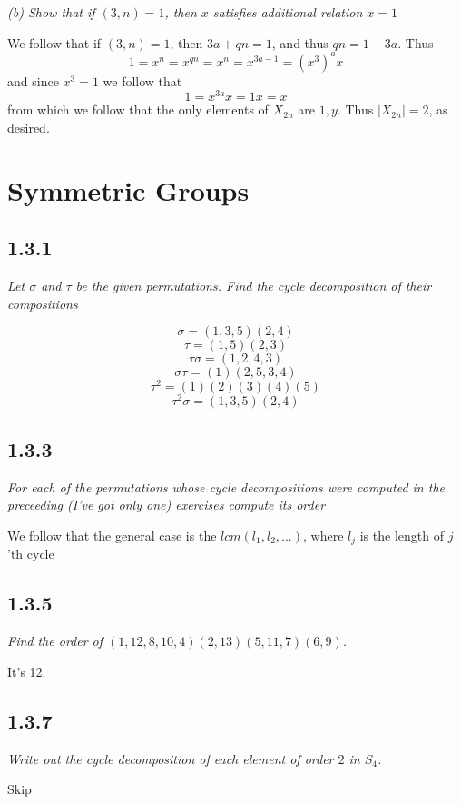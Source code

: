 \documentclass[11pt,oneside,titlepage]{book}
\begin{document}
\textit{(b) Show that if $(3, n) = 1$, then $x$ satisfies additional relation $x = 1$}

We follow that if $(3, n) = 1$, then $3a + qn = 1$, and thus $qn = 1 - 3a$. Thus
$$1 = x^n = x^{qn} = x^n = x^{3a - 1}= (x^3)^a x$$
and since $x^3 = 1$ we follow that
$$1 = x^{3a} x = 1x = x$$
from which we follow that the only elements of $X_{2n}$ are $1, y$. Thus $|X_{2n}| = 2$, as
desired.

\section{Symmetric Groups}

\subsection*{1.3.1}

\textit{Let $\sigma$ and $\tau$ be the given permutations. Find the cycle decomposition
  of their compositions}

$$\sigma = (1, 3, 5)(2, 4)$$
$$\tau = (1, 5)(2, 3)$$
$$\tau \sigma = (1, 2, 4, 3)$$
$$\sigma \tau = (1)(2, 5, 3, 4)$$
$$\tau^2 = (1)(2)(3)(4)(5)$$
$$\tau^2 \sigma = (1, 3, 5)(2, 4)$$

\subsection*{1.3.3}

\textit{For each of the permutations whose cycle decompositions were computed in the preceeding
  (I've got only one) exercises compute its order}

We follow that the general case is the $lcm(l_1, l_2, ...)$, where $l_j$ is the length of
$j$'th cycle


\subsection*{1.3.5}

\textit{Find the order of $(1, 12, 8, 10, 4)(2, 13)(5, 11, 7)(6, 9)$.}

It's 12.

\subsection*{1.3.7}

\textit{Write out the cycle decomposition of each element of order $2$ in $S_4$.}

Skip
\end{document}
